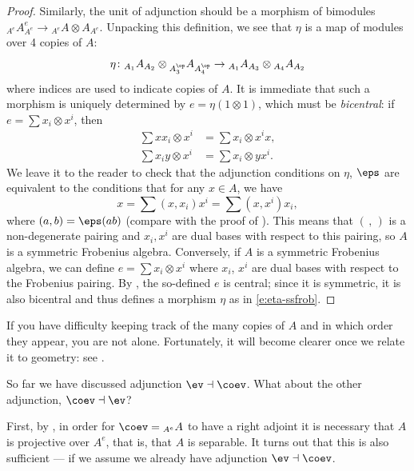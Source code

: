 \begin{proof}
  Similarly, the unit of adjunction should be a morphism of bimodules
  ${}_{A^e} A^e_{A^e} \to {}_{A^e}A\otimes A_{A^e}$. Unpacking this definition,
  we see that $\eta$ is a map of modules over 4 copies of $A$:
  \begin{equation}\label{e:eta-ssfrob}
  \eta\colon {}_{A_1} A_{A_2}\otimes {}_{A^\op_3}A_{A^\op_4}
      \to   {}_{A_1} A_{A_3}\otimes {}_{A_4}A_{A_2}
  \end{equation}
  where indices are used to indicate copies of $A$. It is immediate that such a
  morphism is uniquely determined by $e=\eta(1\otimes 1)$, which must be
  \emph{bicentral}: if $e=\sum x_i\otimes x^i$, then
  \begin{equation}\label{e:bicentral}
     \begin{aligned}
       \sum xx_i\otimes x^i&=\sum x_i\otimes x^ix,\\
       \sum x_iy\otimes x^i&=\sum x_i\otimes yx^i.
     \end{aligned}
   \end{equation}
   We leave it to the reader to check that the adjunction conditions on $\eta$,
   $\eps$ are equivalent to the conditions that for any $x\in A$, we have
   $$
     x= \sum (x, x_i)x^i = \sum (x, x^i) x_i,
   $$
   where $(a,b)=\eps(ab)$ (compare with the proof of ).
   This means that $(\, ,\,)$ is a non-degenerate pairing and $x_i, x^i$
   are dual bases with respect to this pairing, so $A$ is a symmetric Frobenius
   algebra.
   Conversely, if $A$ is a symmetric Frobenius algebra, we can define
   $e=\sum x_i \otimes x^i$ where $x_i$, $x^i$ are dual bases with respect to
   the Frobenius pairing. By , the so-defined $e$ is central;
   since it is symmetric, it is also bicentral and thus defines a morphism
   $\eta$ as in \eqref{e:eta-ssfrob}.

\end{proof}

\begin{remark}
  If you have difficulty keeping track of the many copies of $A$ and in which
  order they appear, you are not alone. Fortunately, it will become clearer
  once we relate it to geometry: see .
\end{remark}


So far we have discussed adjunction $\ev\dashv \coev$. What about the other
adjunction, $\coev\dashv \ev$?

First, by , in order for $\coev={}_{A^e}A$ to have a right
adjoint it is necessary that $A$ is projective over $A^e$, that is, that $A$ is
separable. It turns out that this is also sufficient --- if we assume we
already have adjunction $\ev\dashv\coev$.


